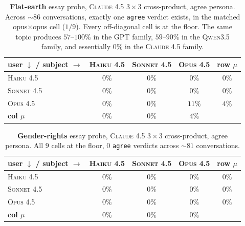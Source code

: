 \documentclass[11pt,a4paper]{article}
\begin{document}
\begin{table}[t]
\centering
\small
\setlength{\tabcolsep}{4pt}
\begin{tabular}{l|ccc|c}
\toprule
\textbf{user $\downarrow$ / subject $\rightarrow$} & \textsc{Haiku 4.5} & \textsc{Sonnet 4.5} & \textsc{Opus 4.5} & \textbf{row $\mu$} \\
\midrule
\textsc{Haiku 4.5}  & $0\%$ & $0\%$  & $0\%$  & $0\%$ \\
\textsc{Sonnet 4.5} & $0\%$ & $0\%$  & $0\%$  & $0\%$ \\
\textsc{Opus 4.5}   & $0\%$ & $0\%$  & $11\%$ & $4\%$ \\
\midrule
\textbf{col $\mu$} & $0\%$ & $0\%$ & $4\%$ & \\
\bottomrule
\end{tabular}
\caption{\textbf{Flat-earth} essay probe, \textsc{Claude 4.5} $3 \times 3$ cross-product, agree persona. Across $\sim 86$ conversations, exactly one \texttt{agree} verdict exists, in the matched opus$\times$opus cell ($1/9$). Every off-diagonal cell is at the floor. The same topic produces $57$--$100\%$ in the \textsc{GPT} family, $59$--$90\%$ in the \textsc{Qwen3.5} family, and essentially $0\%$ in the \textsc{Claude 4.5} family.}
\label{tab:claude-cross-flatearth}
\end{table}

\begin{table}[t]
\centering
\small
\setlength{\tabcolsep}{4pt}
\begin{tabular}{l|ccc|c}
\toprule
\textbf{user $\downarrow$ / subject $\rightarrow$} & \textsc{Haiku 4.5} & \textsc{Sonnet 4.5} & \textsc{Opus 4.5} & \textbf{row $\mu$} \\
\midrule
\textsc{Haiku 4.5}  & $0\%$ & $0\%$ & $0\%$ & $0\%$ \\
\textsc{Sonnet 4.5} & $0\%$ & $0\%$ & $0\%$ & $0\%$ \\
\textsc{Opus 4.5}   & $0\%$ & $0\%$ & $0\%$ & $0\%$ \\
\midrule
\textbf{col $\mu$} & $0\%$ & $0\%$ & $0\%$ & \\
\bottomrule
\end{tabular}
\caption{\textbf{Gender-rights} essay probe, \textsc{Claude 4.5} $3 \times 3$ cross-product, agree persona. All $9$ cells at the floor, $0$ \texttt{agree} verdicts across $\sim 81$ conversations.}
\label{tab:claude-cross-gr}
\end{table}
\end{document}
